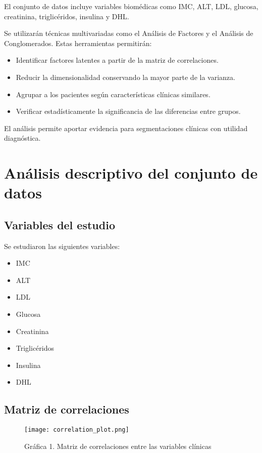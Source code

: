 \documentclass[12pt]{report}
\begin{document}
El conjunto de datos incluye variables biomédicas como IMC, ALT, LDL, glucosa, creatinina, triglicéridos, insulina y DHL. 

Se utilizarán técnicas multivariadas como el Análisis de Factores y el Análisis de Conglomerados. Estas herramientas permitirán:

\begin{itemize}
    \item Identificar factores latentes a partir de la matriz de correlaciones.
    \item Reducir la dimensionalidad conservando la mayor parte de la varianza.
    \item Agrupar a los pacientes según características clínicas similares.
    \item Verificar estadísticamente la significancia de las diferencias entre grupos.
\end{itemize}

El análisis permite aportar evidencia para segmentaciones clínicas con utilidad diagnóstica.

\chapter{Análisis descriptivo del conjunto de datos}

\section{Variables del estudio}
Se estudiaron las siguientes variables:
\begin{itemize}
    \item IMC
    \item ALT
    \item LDL
    \item Glucosa
    \item Creatinina
    \item Triglicéridos
    \item Insulina
    \item DHL
\end{itemize}

\section{Matriz de correlaciones}
\begin{figure}[H]
    \centering
    \texttt{[image: correlation\_plot.png]}
    \caption{Gráfica 1. Matriz de correlaciones entre las variables clínicas}
\end{figure}
\end{document}
